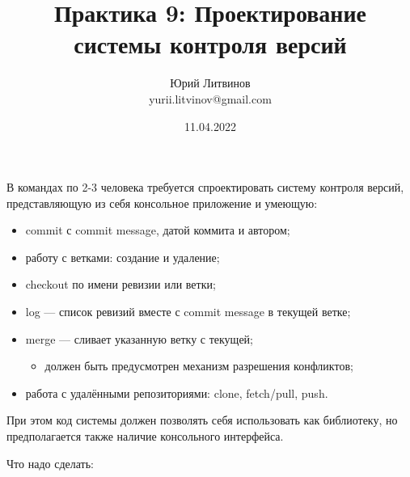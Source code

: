 \documentclass[a5paper]{article}
\title{Практика 9: Проектирование системы контроля версий}
\author{Юрий Литвинов\\\small{yurii.litvinov@gmail.com}}
\date{11.04.2022}
\begin{document}
\maketitle
\thispagestyle{empty}

В командах по 2-3 человека требуется спроектировать систему контроля версий, представляющую из себя консольное приложение и умеющую:

\begin{itemize}
    \item commit с commit message, датой коммита и автором;
    \item работу с ветками: создание и удаление;
    \item checkout по имени ревизии или ветки;
    \item log --- список ревизий вместе с commit message в текущей ветке;
    \item merge --- сливает указанную ветку с текущей;
    \begin{itemize}
        \item должен быть предусмотрен механизм разрешения конфликтов;
    \end{itemize}
    \item работа с удалёнными репозиториями: clone, fetch/pull, push.
\end{itemize}

При этом код системы должен позволять себя использовать как библиотеку, но предполагается также наличие консольного интерфейса.

Что надо сделать:
\end{document}
